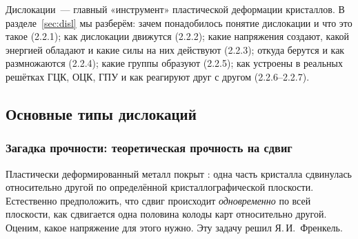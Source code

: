 \begin{orientir}
Дислокации~— главный «инструмент» пластической деформации кристаллов.
В разделе~\ref{sec:disl} мы разберём: зачем понадобилось понятие
дислокации и что это такое (2.2.1); как дислокации движутся (2.2.2);
какие напряжения создают, какой энергией обладают и какие силы на них
действуют (2.2.3); откуда берутся и как размножаются (2.2.4); какие
группы образуют (2.2.5); как устроены в реальных решётках ГЦК, ОЦК, ГПУ
и как реагируют друг с другом (2.2.6--2.2.7).
\end{orientir}

\subsection{Основные типы дислокаций}\label{ssec:disl-types}

\subsubsection{Загадка прочности: теоретическая прочность на сдвиг}

Пластически деформированный металл покрыт :
одна часть кристалла сдвинулась относительно другой по определённой
кристаллографической плоскости. Естественно предположить, что сдвиг
происходит \emph{одновременно} по всей плоскости, как сдвигается одна
половина колоды карт относительно другой. Оценим, какое напряжение для
этого нужно. Эту задачу решил Я.\,И.~Френкель.

